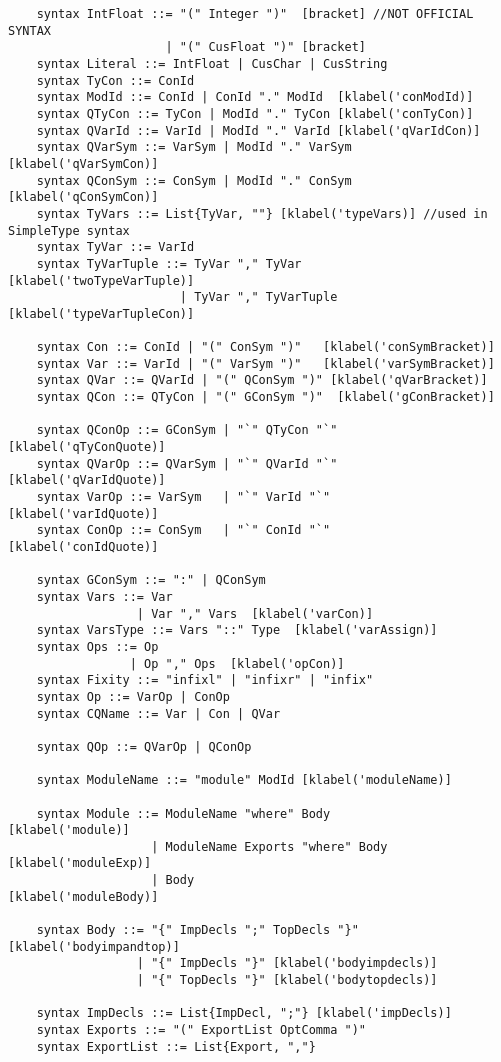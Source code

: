 \begin{lstlisting}
    syntax IntFloat ::= "(" Integer ")"  [bracket] //NOT OFFICIAL SYNTAX
                      | "(" CusFloat ")" [bracket]
    syntax Literal ::= IntFloat | CusChar | CusString
    syntax TyCon ::= ConId
    syntax ModId ::= ConId | ConId "." ModId  [klabel('conModId)]
    syntax QTyCon ::= TyCon | ModId "." TyCon [klabel('conTyCon)]
    syntax QVarId ::= VarId | ModId "." VarId [klabel('qVarIdCon)]
    syntax QVarSym ::= VarSym | ModId "." VarSym  [klabel('qVarSymCon)]
    syntax QConSym ::= ConSym | ModId "." ConSym  [klabel('qConSymCon)]
    syntax TyVars ::= List{TyVar, ""} [klabel('typeVars)] //used in SimpleType syntax
    syntax TyVar ::= VarId
    syntax TyVarTuple ::= TyVar "," TyVar      [klabel('twoTypeVarTuple)]
                        | TyVar "," TyVarTuple [klabel('typeVarTupleCon)]

    syntax Con ::= ConId | "(" ConSym ")"   [klabel('conSymBracket)]
    syntax Var ::= VarId | "(" VarSym ")"   [klabel('varSymBracket)]
    syntax QVar ::= QVarId | "(" QConSym ")" [klabel('qVarBracket)]
    syntax QCon ::= QTyCon | "(" GConSym ")"  [klabel('gConBracket)]

    syntax QConOp ::= GConSym | "`" QTyCon "`"    [klabel('qTyConQuote)]
    syntax QVarOp ::= QVarSym | "`" QVarId "`"    [klabel('qVarIdQuote)]
    syntax VarOp ::= VarSym   | "`" VarId "`"     [klabel('varIdQuote)]
    syntax ConOp ::= ConSym   | "`" ConId "`"     [klabel('conIdQuote)]

    syntax GConSym ::= ":" | QConSym
    syntax Vars ::= Var
                  | Var "," Vars  [klabel('varCon)]
    syntax VarsType ::= Vars "::" Type  [klabel('varAssign)]
    syntax Ops ::= Op
                 | Op "," Ops  [klabel('opCon)]
    syntax Fixity ::= "infixl" | "infixr" | "infix"
    syntax Op ::= VarOp | ConOp
    syntax CQName ::= Var | Con | QVar

    syntax QOp ::= QVarOp | QConOp

    syntax ModuleName ::= "module" ModId [klabel('moduleName)]

    syntax Module ::= ModuleName "where" Body          [klabel('module)]
                    | ModuleName Exports "where" Body  [klabel('moduleExp)]
                    | Body                             [klabel('moduleBody)]

    syntax Body ::= "{" ImpDecls ";" TopDecls "}" [klabel('bodyimpandtop)]
                  | "{" ImpDecls "}" [klabel('bodyimpdecls)]
                  | "{" TopDecls "}" [klabel('bodytopdecls)]

    syntax ImpDecls ::= List{ImpDecl, ";"} [klabel('impDecls)]
    syntax Exports ::= "(" ExportList OptComma ")"
    syntax ExportList ::= List{Export, ","}


\end{lstlisting}
